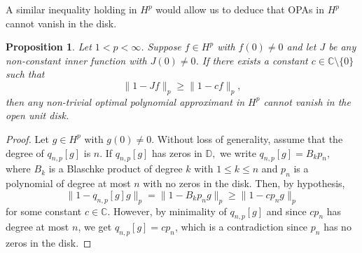 \documentclass{article}
\theoremstyle{plain}
\numberwithin{Theorem}{section}
\numberwithin{equation}{section}
\theoremstyle{plain}
\newtheorem{Proposition}[Theorem]{Proposition}
\theoremstyle{definition}
\renewcommand{\leq}{\leqslant}
\renewcommand{\geq}{\geqslant}
\newcommand{\D}{\mathbb{D}}
\newcommand{\chris}[1]{{\color{Plum}#1}}
\begin{document}
A similar inequality holding in $H^p$ would allow us to deduce that OPAs in $H^p$ cannot vanish in the disk. 

\begin{Proposition}\label{DI}
Let $1 < p < \infty$. Suppose $f \in H^p$ with $f(0) \neq 0$ and let $J$ be any non-constant inner function with $J(0)\neq 0$. If there exists a constant $c \in\mathbb{C}\setminus\{0\}$ such that 
\begin{equation*}
    \| 1 - J f \|_p \geq \|1 - cf\|_p, 
\end{equation*}
then any non-trivial optimal polynomial approximant in $H^p$ cannot vanish in the open unit disk.  
\end{Proposition}
\begin{proof}
Let $g \in H^p$ with $g(0) \neq 0$. Without loss of generality, assume that the degree of $q_{n,p}[g]$ is $n$. If $q_{n,p}[g]$ has zeros in $\D,$ we write $q_{n,p}[g] = B_k p_n,$ where $B_k$ is a Blaschke product of degree $k$ with $1 \leq k \leq n $ and $p_n$ is a polynomial of degree at most $n$ with no zeros in the disk. Then, by hypothesis,
\begin{equation*}
    \|1 - q_{n,p}[g]g \|_p = \|1 - B_kp_ng\|_p \geq \|1-cp_ng\|_p
\end{equation*}
for some constant $c\in\mathbb{C}$. However, by minimality of $q_{n,p}[g]$ and since $cp_n$ has degree at most $n$, we get $q_{n,p}[g] = cp_n$, which is a contradiction since $p_n$ has no zeros in the disk.
\end{proof}

\end{document}

